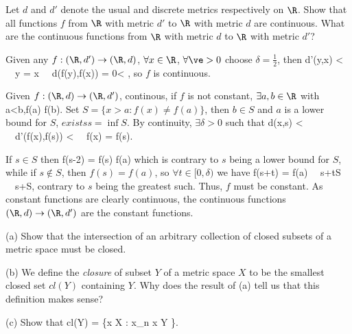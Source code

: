 \begin{problem}Let $d$ and $d'$ denote the usual and discrete metrics respectively on $\R$. Show that all functions $f$ from $\R$ with metric $d'$ to $\R$ with metric $d$ are continuous. What are the continuous functions from $\R$ with metric $d$ to $\R$ with metric $d'$?



\end{problem}

\begin{solution}[\bf Solution.]Given any $f:(\R,d') \to (\R,d)$, $\forall x\in\R$, $\forall \ve >0$ choose $\delta=\frac 12$, then
\be
d'(y,x) < \delta \ \ra \ y = x \ \ra \ d(f(y),f(x)) = 0< \ve,
\ee
so $f$ is continuous. 

Given $f:(\R,d) \to (\R,d')$, continous, if $f$ is not constant, $\exists a,b\in\R$ with 
\be
a<b,\quad f(a) \neq f(b).
\ee
Set $S = \{x>a:f(x)\neq f(a)\}$, then $b\in S$ and $a$ is a lower bound for $S$, $exists s = \inf S$. By continuity, $\exists \delta >0$ such that
\be
d(x,s) < \delta \ \ra \ d'(f(x),f(s)) <  \ \ra \ f(x) = f(s).
\ee

If $s\in S$ then
\be
f(s-\tfrac{\delta}2) = f(s) \neq f(a)
\ee
which is contrary to $s$ being a lower bound for $S$, while if $s\notin S$, then $f(s) = f(a)$, so $\forall t\in [0,\delta)$ we have
\be
f(s+t) = f(a) \ \ra \ s+t\notin S \ \ra \ s+\delta {}S,
\ee
contrary to $s$ being the greatest such. Thus, $f$ must be constant. As constant functions are clearly continuous, the continuous functions $(\R,d)\to (\R,d')$ are the constant functions.



\end{solution}

\begin{problem}\ben
\item [(a)] Show that the intersection of an arbitrary collection of closed subsets of a metric space must be closed.
\item [(b)] We define the \emph{closure} of subset $Y$ of a metric space $X$ to be the smallest closed set $cl(Y)$ containing $Y$. Why does the result of (a) tell us that this definition makes sense?
\item [(c)] Show that
\be
cl(Y) = \{x \in X : x_n \to x Y \}.
\ee
\een



\end{problem}


